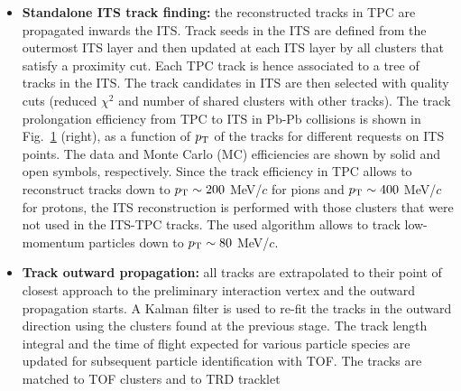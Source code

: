 \begin{itemize}
even in most central Pb-Pb collisions.
The efficiency of tracking in TPC is defined as the ratio between the reconstructed tracks 
and the generated primary particles in the simulation, and is shown in Fig.~\ref{fig:TPCtrackEffAndME} (left) as a function of 
the transverse momentum of the track. The tracking efficiency steeply drops below $\pt \sim 0.5 \, \Gevc$
due to the interaction of the particles with the detector material. The efficiency is almost 
independent of the occupancy in the detector. 
\begin{figure}[!h]
\centering
\texttt{[image: FigCap3/TPCtrackEff.png]}
\texttt{[image: FigCap3/ITSTPCmatchEff.png]}
\caption{Left: TPC track finding efficiency for primary particles in pp and Pb-Pb collisions (simulation)~\cite{Abelev:2014ffa}. Right: ITS-TPC matching efficiency versus $\pt$ for data and Monte Carlo for Pb-Pb collisions~\cite{Abelev:2014ffa}.}
\label{fig:TPCtrackEffAndME}
\end{figure}
\item{\bf Standalone ITS track finding:} the reconstructed tracks in TPC are propagated inwards the ITS.
Track seeds in the ITS are defined from the outermost ITS layer and then updated at each ITS layer by 
all clusters that satisfy a proximity cut. Each TPC track is hence associated to a tree of tracks in the ITS.
The track candidates in ITS are then selected with quality cuts (reduced $\chi^2$ and number of shared clusters with
other tracks). The track prolongation efficiency from TPC to ITS in Pb-Pb collisions is shown in Fig.~\ref{fig:TPCtrackEffAndME} (right),
as a function of $\pt$ of the tracks for different requests on ITS points. 
The data and Monte Carlo (MC) efficiencies are shown by solid and open symbols, respectively. 
Since the track efficiency in TPC allows to reconstruct tracks down to $p_{\rm T} \sim 200$ MeV/$c$ for pions 
and $p_{\rm T} \sim 400$ MeV/$c$ for protons, the ITS reconstruction is performed with those clusters 
that were not used in the ITS-TPC tracks. The used algorithm allows to track low-momentum particles 
down to $p_{\rm T} \sim 80$ MeV/$c$.
\item{\bf Track outward propagation:} all tracks are extrapolated to their point of closest approach to the 
preliminary interaction vertex and the outward propagation starts. A Kalman filter is used to re-fit the tracks 
in the outward direction using the clusters found at the previous stage. 
The track length integral and the time of flight expected for various particle species are updated for 
subsequent particle identification with TOF. The tracks are matched to TOF clusters and to TRD tracklet

\end{itemize}
